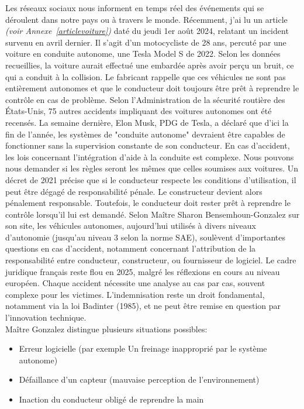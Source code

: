 Les réseaux sociaux nous informent en temps réel des événements qui se déroulent dans notre pays ou à travers le monde. 
Récemment, j'ai lu un article \emph{(voir Annexe~\ref{articlevoiture})} daté du jeudi 1er août 2024, relatant un incident survenu en avril dernier. Il s'agit d'un motocycliste de 28 ans, percuté par une voiture en conduite autonome, une Tesla Model S de 2022. Selon les données recueillies, la voiture aurait effectué une embardée après avoir perçu un bruit, ce qui a conduit à la collision. Le fabricant rappelle que ces véhicules ne sont pas entièrement autonomes et que le conducteur doit toujours être prêt à reprendre le contrôle en cas de problème. Selon l'Administration de la sécurité routière des États-Unis, 75 autres accidents impliquant des voitures autonomes ont été recensés. 
La semaine dernière, Elon Musk, PDG de Tesla, a déclaré que d'ici la fin de l'année, les systèmes de "conduite autonome" devraient être capables de fonctionner sans la supervision constante de son conducteur.
En cas d'accident, les lois concernant l'intégration d'aide à la conduite est complexe. Nous pouvons nous demander si les règles seront les mêmes que celles soumises aux voitures. Un décret de 2021 précise que si le conducteur respecte les conditions d’utilisation, il peut être dégagé de responsabilité pénale. Le constructeur devient alors pénalement responsable. Toutefois, le conducteur doit rester prêt à reprendre le contrôle lorsqu’il lui est demandé. Selon  Maître Sharon Bensemhoun-Gonzalez sur son site\cite{avocat}, les véhicules autonomes, aujourd’hui utilisés à divers niveaux d’autonomie (jusqu’au niveau 3 selon la norme SAE), soulèvent d’importantes questions en cas d’accident, notamment concernant l’attribution de la responsabilité entre conducteur, constructeur, ou fournisseur de logiciel. Le cadre juridique français reste flou en 2025, malgré les réflexions en cours au niveau européen. Chaque accident nécessite une analyse au cas par cas, souvent complexe pour les victimes. L’indemnisation reste un droit fondamental, notamment via la loi Badinter (1985), et ne peut être remise en question par l’innovation technique.\\
Maître Gonzalez distingue plusieurs situations possibles:
\begin{itemize}
    \item Erreur logicielle (par exemple Un freinage inapproprié par le système autonome)
    \item Défaillance d’un capteur (mauvaise perception de l’environnement)
    \item Inaction du conducteur obligé de reprendre la main 
\end{itemize}
